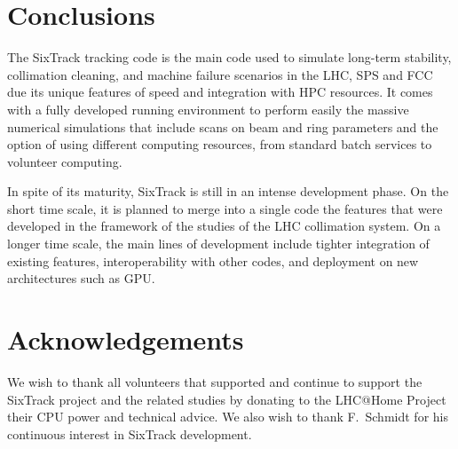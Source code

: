 \documentclass[a4paper,
              ]{jacow}
\begin{document}
\section{Conclusions}

The SixTrack tracking code is the main code used to simulate long-term stability, collimation cleaning, and machine failure scenarios in the LHC, SPS and FCC due its unique features of speed and integration with HPC resources. It comes with a fully developed running environment to perform easily the massive numerical simulations that include scans on beam and ring parameters and the option of using different computing resources, from standard batch services to volunteer computing. 

In spite of its maturity, SixTrack is still in an intense development phase. On the short time scale, it is planned to merge into a single code the features that were developed in the framework of the studies of the LHC collimation system. On a longer time scale, the main lines of development include  tighter integration of existing features, interoperability with other codes, and deployment on new architectures such as GPU.

\section{Acknowledgements}

We wish to thank all volunteers that supported and continue to support the SixTrack project and the related studies by donating  to the LHC@Home Project their CPU power and technical advice. We also wish to thank F.~Schmidt for his continuous interest in SixTrack development.
\end{document}
